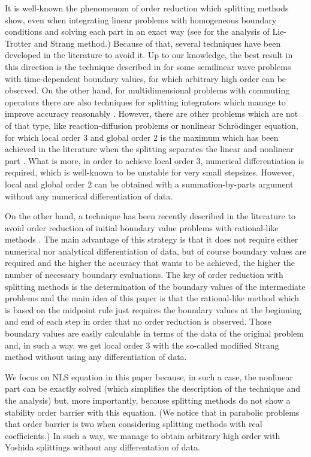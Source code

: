 \documentclass[a4paper,12pt]{article}
\begin{document}
It is well-known the phenomenom of order reduction which splitting methods show, even when integrating linear problems with homogeneous boundary conditions and solving each part in an exact way (see \cite{FOS} for the analysis of Lie-Trotter and Strang method.) Because of that, several techniques have been developed in the literature to avoid it. Up to our knowledge, the best result in this direction is the technique described in \cite{APo} for some semilinear wave problems with time-dependent boundary values, for which arbitrary high order can be observed. On the other hand, for multidimensional problems with commuting operators there are also techniques for splitting integrators which manage to improve accuracy reasonably \cite{ACJ,ACR0, GH}. However, there are other problems which are not of that type, like reaction-diffusion problems or nonlinear Schr\"odinger equation, for which local order $3$ and global order $2$ is the maximum which has been achieved in the literature when the splitting separates the linear and nonlinear part \cite{ACR, ACR1, CR, EO1, EO2}. What is more, in order to achieve local order $3$, numerical differentiation is required, which is well-known to be unstable for very small stepsizes. However, local and global order $2$ can be obtained with a summation-by-parts argument without any numerical differentiation of data.

On the other hand, a technique has been recently described in the literature to avoid order reduction of initial boundary value problems with rational-like methods \cite{ACP}. The main advantage of this strategy is that it does not require either numerical nor analytical differentiation of data, but of course boundary values are required and the higher the accuracy that wants to be achieved, the higher the number
of necessary boundary evaluations. The key of order reduction with splitting methods is the determination of the boundary values of the intermediate problems and the main idea of this paper is that the rational-like method which is based on the midpoint rule just requires the boundary values at the beginning and end of each step in order that no order reduction is observed. Those boundary values are easily calculable in terms of the data of the original problem and, in such a way, we get local order $3$ with the so-called modified Strang method without using any differentiation of data.

We focus on NLS equation in this paper  because, in such a case, the nonlinear part can be exactly solved (which simplifies the description of the technique and the analysis) but, more importantly, because splitting methods do not show a stability order barrier with this equation. (We notice that in parabolic problems that order barrier is two \cite{BC, Sh} when considering splitting methods with real coefficients.) In such a way, we manage to obtain arbitrary high order with Yoshida splittings \cite{Y} without any differentation of data.
\end{document}
